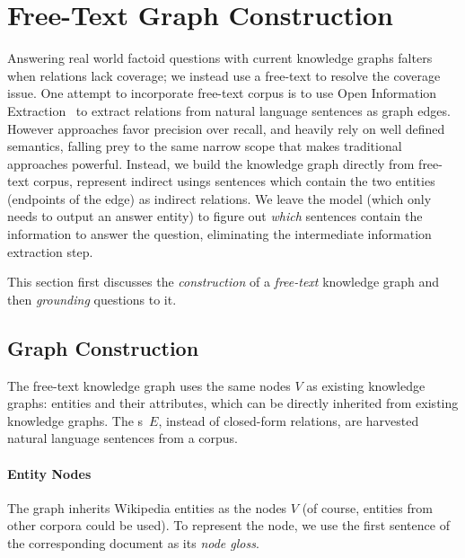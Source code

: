 
\section{Free-Text Graph Construction}
\label{sec:evidence}

Answering real world factoid questions with current knowledge
graphs falters when \kg{} relations lack coverage; we instead
use a free-text \kg{} to resolve the coverage
issue. One attempt to incorporate free-text corpus is to use Open
Information Extraction~\cite[\openie]{Lu:2019:ACQ} to extract
relations from natural language sentences as graph edges.
%
However \openie{} approaches
favor precision over recall, and heavily rely on well defined semantics, falling prey to the same
narrow scope that makes traditional  approaches powerful.
%
Instead, we build the knowledge graph directly from free-text corpus,
represent indirect usings sentences which contain the two entities
(endpoints of the edge) as indirect relations.
%
We leave the  model (which only needs to output an answer
entity) to figure out \emph{which} sentences contain the information
to answer the question, eliminating the intermediate information
extraction step.

This section first discusses the \textit{construction} of a
\emph{free-text} knowledge graph and then \textit{grounding} questions
to it.

\subsection{Graph Construction}


The free-text knowledge graph uses the same nodes $V$ as
existing knowledge graphs: entities and their attributes, which can be
directly inherited from existing knowledge graphs.
%
The \tweennode{}s~$E$, instead of closed-form relations, are harvested natural
language sentences from a corpus.

\paragraph{Entity Nodes}

The graph inherits Wikipedia entities as the nodes $V$ (of course,
entities from other corpora could be used).
To represent the node, we use the first sentence of the corresponding
document as its \textit{node gloss}.

